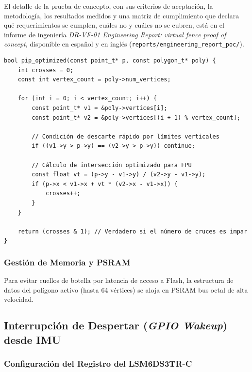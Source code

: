 El detalle de la prueba de concepto, con sus criterios de aceptación, la metodología, los resultados medidos y una matriz de cumplimiento que declara qué requerimientos se cumplen, cuáles no y cuáles no se cubren, está en el informe de ingeniería \emph{DR-VF-01 Engineering Report: virtual fence proof of concept}, disponible en español y en inglés (\texttt{reports/engineering\_report\_poc/}).

\begin{verbatim}
bool pip_optimized(const point_t* p, const polygon_t* poly) {
    int crosses = 0;
    const int vertex_count = poly->num_vertices;
    
    for (int i = 0; i < vertex_count; i++) {
        const point_t* v1 = &poly->vertices[i];
        const point_t* v2 = &poly->vertices[(i + 1) % vertex_count];
        
        // Condición de descarte rápido por límites verticales
        if ((v1->y > p->y) == (v2->y > p->y)) continue;
        
        // Cálculo de intersección optimizado para FPU
        const float vt = (p->y - v1->y) / (v2->y - v1->y);
        if (p->x < v1->x + vt * (v2->x - v1->x)) {
            crosses++;
        }
    }
    
    return (crosses & 1); // Verdadero si el número de cruces es impar
}
\end{verbatim}

\subsubsection{Gestión de Memoria y PSRAM}

Para evitar cuellos de botella por latencia de acceso a Flash, la estructura de datos del polígono activo (hasta 64 vértices) se aloja en PSRAM bus octal de alta velocidad.

\subsection{Interrupción de Despertar (\textit{GPIO Wakeup}) desde IMU}

\subsubsection{Configuración del Registro del LSM6DS3TR-C}

